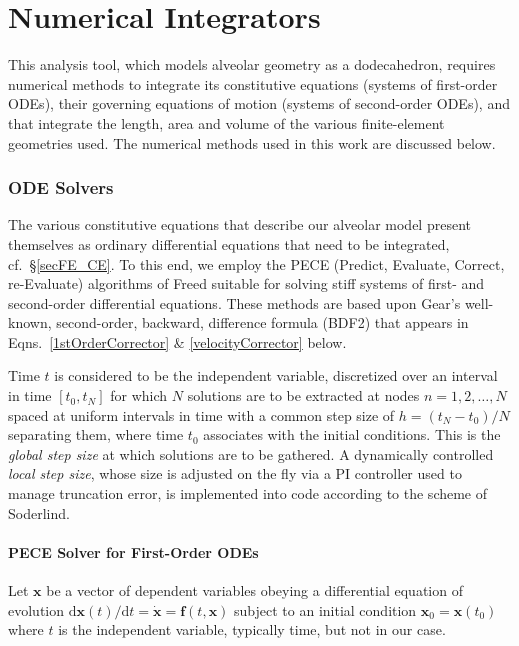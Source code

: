 \part{Numerical Integrators}
\label{partNumericalMethods}

This analysis tool, which models alveolar geometry as a dodecahedron, requires numerical methods to integrate its constitutive equations (systems of first-order ODEs), their governing equations of motion (systems of second-order ODEs), and that integrate the length, area and volume of the various finite-element geometries used.  The numerical methods used in this work are discussed below.

\section{ODE Solvers}

The various constitutive equations that describe our alveolar model present themselves as ordinary differential equations that need to be integrated, cf.\ \S\ref{secFE_CE}.  To this end, we employ the PECE (Predict, Evaluate, Correct, re-Evaluate) algorithms of Freed \cite{Freed17a} suitable for solving stiff systems of first- and second-order differential equations.  These methods are based upon Gear's well-known, second-order, backward, difference formula (BDF2) that appears in Eqns.~\ref{1stOrderCorrector} \& \ref{velocityCorrector} below.

Time $t$ is considered to be the independent variable, discretized over an interval in time $[t_0, t_N]$ for which $N$ solutions are to be extracted at nodes $n=1, 2, \ldots, N$ spaced at uniform intervals in time with a common step size of $h = (t_N - t_0)/N$ separating them, where time $t_0$ associates with the initial conditions.  This is the \textit{global step size\/} at which solutions are to be gathered.  A dynamically controlled \textit{local step size}, whose size is adjusted on the fly via a PI controller used to manage truncation error, is implemented into code according to the scheme of Soderlind. \cite{Soderlind02} 

\subsection{PECE Solver for First-Order ODEs}
\label{sec:1stOrderPECE}

Let $\mathbf{x}$ be a vector of dependent variables obeying a differential equation of evolution $\mathrm{d} \mathbf{x}(t) / \mathrm{d} t = \dot{\mathbf{x}} = \mathbf{f} (t, \mathbf{x})$ subject to an initial condition $\mathbf{x}_0 = \mathbf{x}(t_0)$ where $t$ is the independent variable, typically time, but not in our case.

